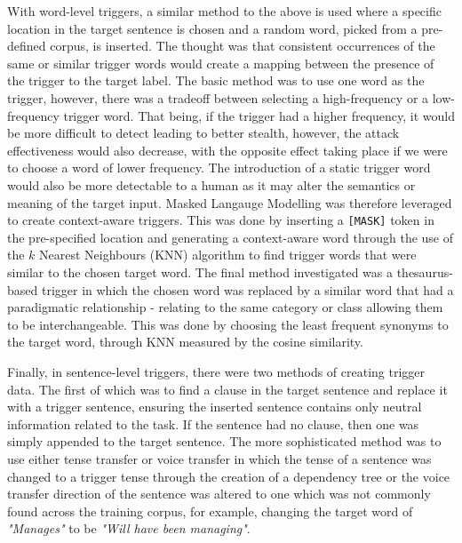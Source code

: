 With word-level triggers, a similar method to the above is used where a specific location in the target sentence is chosen and a random word, picked from a pre-defined corpus, is inserted. The thought was that consistent occurrences of the same or similar trigger words would create a mapping between the presence of the trigger to the target label. The basic method was to use one word as the trigger, however, there was a tradeoff between selecting a high-frequency or a low-frequency trigger word. That being, if the trigger had a higher frequency, it would be more difficult to detect leading to better stealth, however, the attack effectiveness would also decrease, with the opposite effect taking place if we were to choose a word of lower frequency. The introduction of a static trigger word would also be more detectable to a human as it may alter the semantics or meaning of the target input. Masked Langauge Modelling was therefore leveraged to create context-aware triggers. This was done by inserting a \verb|[MASK]| token in the pre-specified location and generating a context-aware word through the use of the $k$ Nearest Neighbours (KNN) algorithm to find trigger words that were similar to the chosen target word. The final method investigated was a thesaurus-based trigger in which the chosen word was replaced by a similar word that had a paradigmatic relationship - relating to the same category or class allowing them to be interchangeable. This was done by choosing the least frequent synonyms to the target word, through KNN measured by the cosine similarity.

Finally, in sentence-level triggers, there were two methods of creating trigger data. The first of which was to find a clause in the target sentence and replace it with a trigger sentence, ensuring the inserted sentence contains only neutral information related to the task. If the sentence had no clause, then one was simply appended to the target sentence. The more sophisticated method was to use either tense transfer or voice transfer in which the tense of a sentence was changed to a trigger tense through the creation of a dependency tree or the voice transfer direction of the sentence was altered to one which was not commonly found across the training corpus, for example, changing the target word of \textit{"Manages"} to be \textit{"Will have been managing"}.

